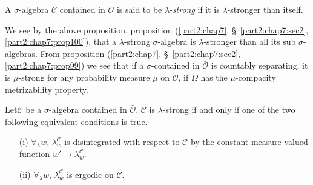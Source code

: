 \begin{defn}\label{part2:chap7:def101}
A $\sigma$-algebra $\mathscr{C}$ contained in $\bar{\mathscr{O}}$ is
said to be {$\lambda$-{\em strong}} if it is $\lambda$-stronger than itself.
\end{defn}


We see by the above proposition, proposition (\ref{part2:chap7},
\S\ \ref{part2:chap7:sec2}, \ref{part2:chap7:prop100}), that a 
$\lambda$-strong $\sigma$-algebra is $\lambda$-stronger than all its
sub $\sigma$-algebras. From proposition (\ref{part2:chap7},
\S\ \ref{part2:chap7:sec2}, \ref{part2:chap7:prop99}) we see that
if a $\sigma$-contained in $\bar{\mathscr{O}}$ is countably
separating, it is $\mu$-strong for any probability measure $\mu$ on
$\mathscr{O}$, if $\Omega$ has the $\mu$-compacity metrizability
property. 

\begin{proposition}\label{part2:chap7:prop102}
Let\pageoriginale $\mathscr{C}$  be a $\sigma$-algebra contained in
$\bar{\mathscr{O}}$. $\mathscr{C}$ is $\lambda$-strong if and only if
one of the two following equivalent conditions is true. 
\begin{itemize}
\item[{\rm (i)}] $\forall_\lambda w$, $\lambda^\mathscr{C}_w$ is
  disintegrated with respect to $\mathscr{C}$ by the constant measure
  valued function $w' \to \lambda^\mathscr{C}_w$.

\item[{\rm (ii)}] $\forall_\lambda w$, $\lambda^\mathscr{C}_w$ is
  ergodic on $\mathscr{C}$. 
\end{itemize}
\end{proposition}

